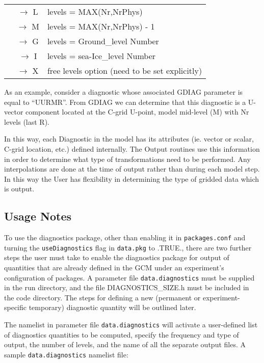 \begin{table}
\begin{center}
\begin{tabular}{ |c|c|l| }
           & $\rightarrow$ L &  levels = MAX(Nr,NrPhys)  \\
           & $\rightarrow$ M &  levels = MAX(Nr,NrPhys) - 1  \\
           & $\rightarrow$ G &  levels = Ground\_level Number \\
           & $\rightarrow$ I &  levels = sea-Ice\_level Number \\
           & $\rightarrow$ X &  free levels option (need to be set explicitly)\\ \hline
\end{tabular}
\end{center}
\end{table}


\noindent
As an example, consider a diagnostic whose associated GDIAG parameter is equal
to ``UUR\hspace{5mm}MR''.  From GDIAG we can determine that this diagnostic is a 
U-vector component located at the C-grid U-point, model mid-level (M)
with Nr levels (last R).

\noindent
In this way, each Diagnostic in the model has its attributes (ie. vector or scalar,
C-grid location, etc.) defined internally.  The Output routines use this information 
in order to determine what type of transformations need to be performed.  Any 
interpolations are done at the time of output rather than during each model step.
In this way the User has flexibility in determining the type of gridded data which 
is output.

\subsection{Usage Notes}
\label{sec:diagnostics:usersguide}

\noindent
To use the diagnostics package, other than enabling it in {\tt packages.conf}
and turning the {\tt useDiagnostics} flag in {\tt data.pkg} to .TRUE., there are two
further steps the user must take to enable the diagnostics package for
output of quantities that are already defined in the GCM under an experiment's
configuration of packages.  
A parameter file {\tt data.diagnostics} must be supplied in the run directory,
and the file DIAGNOSTICS\_SIZE.h must be included in the 
code directory.  The steps for defining a new (permanent or experiment-specific 
temporary) diagnostic quantity will be outlined later. 

\noindent The namelist in parameter file {\tt data.diagnostics} will activate 
a user-defined list of diagnostics quantities to be computed, 
specify the frequency and type of output, the number of levels, and 
the name of all the separate output files. 
A sample {\tt data.diagnostics} namelist file:

